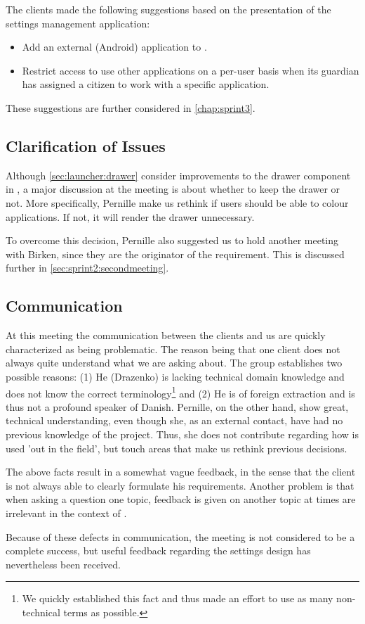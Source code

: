 The clients made the following suggestions based on the presentation of the settings management application:

\begin{itemize}
\item Add an external (Android) application to \launcher.
\item Restrict access to use other applications on a per-user basis when its guardian has assigned a citizen to work with a specific application.
\end{itemize}

These suggestions are further considered in \cref{chap:sprint3}.

\subsection{Clarification of Issues}
Although \cref{sec:launcher:drawer} consider improvements to the drawer component in \giraf, a major discussion at the meeting is about whether to keep the drawer or not.
More specifically, Pernille make us rethink if users should be able to colour applications.
If not, it will render the drawer unnecessary.

To overcome this decision, Pernille also suggested us to hold another meeting with Birken, since they are the originator of the requirement.
This is discussed further in \cref{sec:sprint2:secondmeeting}.

\subsection{Communication}
At this meeting the communication between the clients and us are quickly characterized as being problematic.
The reason being that one client does not always quite understand what we are asking about.
The group establishes two possible reasons:
(1) He (Drazenko) is lacking technical domain knowledge and does not know the correct terminology\footnote{We quickly established this fact and thus made an effort to use as many non-technical terms as possible.} and (2) He is of foreign extraction and is thus not a profound speaker of Danish.
Pernille, on the other hand, show great, technical understanding, even though she, as an external contact, have had no previous knowledge of the \giraf project.
Thus, she does not contribute regarding how \giraf is used 'out in the field', but touch areas that make us rethink previous decisions.

The above facts result in a somewhat vague feedback, in the sense that the client is not always able to clearly formulate his requirements.
Another problem is that when asking a question one topic, feedback is given on another topic at times are irrelevant in the context of \launcher.

Because of these defects in communication, the meeting is not considered to be a complete success, but useful feedback regarding the settings design has nevertheless been received.
